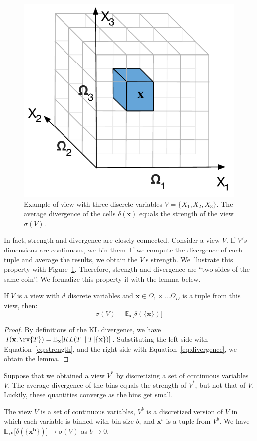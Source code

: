 \begin{figure}[t!]
\centering
\includegraphics[width=0.5\columnwidth]{images/3Dtest}
\caption{Example of view with three discrete variables $V = \{X_1, X_2, X_3\}$.
The average divergence of the cells $\delta(\mathbf{x})$ equals the strength of
the view  $\sigma(V)$.}
\label{fig:binningexample}
\end{figure}
In fact, strength and divergence are closely connected.  Consider a view $V$.
If $V's$ dimensions are continuous, we bin them. If we compute the divergence
of each tuple and average the results, we obtain the $V$'s strength. We illustrate
this property with Figure~\ref{fig:binningexample}.  Therefore, strength and
divergence are ``two sides of the same coin''. We formalize this property it
with the lemma below.
\begin{lemma}
    If $V$ is a view with $d$ discrete variables and $\mathbf{x} \in \Omega_1
    \times \ldots \Omega_D$ is a tuple from this view, then:
    \begin{equation}\label{eq:coin}
        \sigma(V) = \mathbb{E}_{\mathbf{x}}  \big[ \delta(\{\mathbf{x}\}) \big]
    \end{equation}
\end{lemma}
\begin{proof}
    By definitions of the KL divergence, we have 
    $I(\mathbf{x} ; \rv{T})= \mathbb{E}_{\mathbf{x}}[ KL( T \parallel T |
    \{\mathbf{x}\} )]$.
    Substituting the left side with Equation~\ref{eq:strength}, and the right
    side with Equation~\ref{eq:divergence}, we obtain the lemma.
\end{proof}
Suppose that we obtained a view $V^*$ by discretizing a set of continuous
variables $V$. The average divergence of the bins equals the strength of $V^*$,
but not that of $V$. Luckily, these quantities converge as the bins get small.
\begin{lemma}
    The view $V$ is a set of continuous variables, $V^b$ is a discretized
    version of $V$ in which each variable is binned with bin size $b$, and
    $\mathbf{x}^b$ is a tuple from $V^b$. We have $\mathbb{E}_{\mathbf{x^b}}
    \big[ \delta(\{\mathbf{x^b}\}) \big] \to  \sigma(V)$ as $b \to 0$.
\end{lemma}
